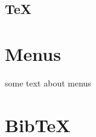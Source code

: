 \documentclass[11pt]{book}
\begin{document}
\section{\TeX}
\appendix
\chapter{Menus}
some text about menus
\chapter{Bib\TeX}

\printindex

 
\end{document}
